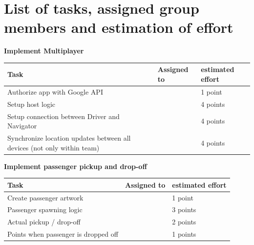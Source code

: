 \documentclass{article}
\begin{document}
\section*{List of tasks, assigned group members and estimation of effort}
\textbf{Implement Multiplayer} \\
\begin{tabular}{ | l | l | l | }
\hline
\textbf{Task} & \textbf{Assigned to} & \textbf{estimated effort} \\ \hline
Authorize app with Google API &  & 1 point\\ \hline
Setup host logic &  & 4 points\\ \hline
Setup connection between Driver and Navigator &  & 4 points \\ \hline
Synchronize location updates between all devices (not only within team) & & 4 points \\ \hline
\end{tabular} \newline
\newline
\textbf{Implement passenger pickup and drop-off} \\
\begin{tabular}{ | l | l | l | }
\hline
\textbf{Task} & \textbf{Assigned to} & \textbf{estimated effort} \\ \hline
Create passenger artwork & & 1 point\\ \hline
Passenger spawning logic & & 3 points\\ \hline
Actual pickup / drop-off & & 2 points\\ \hline
Points when passenger is dropped off & & 1 points\\ \hline
\end{tabular}
\end{document}
